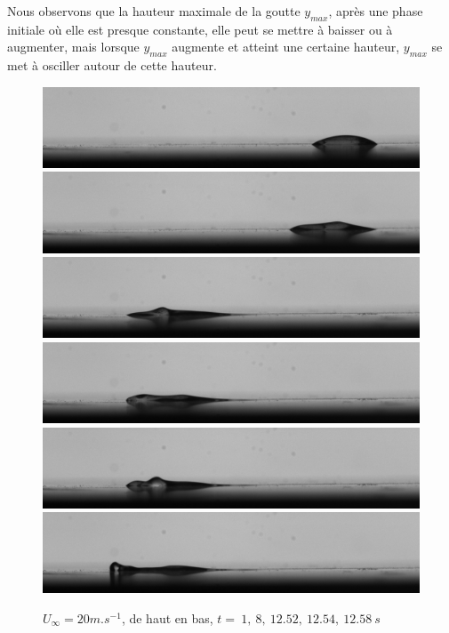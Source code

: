 Nous observons que la hauteur maximale de la goutte $y_{max}$, après une phase initiale où elle est presque constante, elle peut se mettre à baisser ou à augmenter, mais lorsque $y_{max}$ augmente et atteint une certaine hauteur, $y_{max}$ se met à osciller autour de cette hauteur.
\newpage
\begin{figure}[!ht]
		\includegraphics[width = \linewidth]{./image/test.jpg}
		\includegraphics[width = \linewidth]{./image/test400.jpg}
		\includegraphics[width = \linewidth]{./image/test626.jpg}
		\includegraphics[width = \linewidth]{./image/test627.jpg}
		\includegraphics[width = \linewidth]{./image/test628.jpg}
		\includegraphics[width = \linewidth]{./image/test629.jpg}
	\caption{$U_{\infty}=20m.s^{-1}$, de haut en bas, 
	$t = ~1,~8,~12.52,~12.54,~12.58~s$}
		\label{fig:test}
\end{figure}

